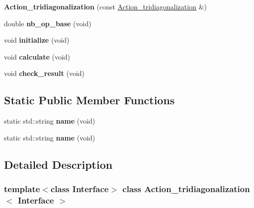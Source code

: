 \begin{DoxyCompactItemize}
\mbox{\label{class_action__tridiagonalization_a8c56518c3b051aa81d9f206db803540f}} 
{\bfseries Action\+\_\+tridiagonalization} (const \hyperlink{class_action__tridiagonalization}{Action\+\_\+tridiagonalization} \&)
\item 
\mbox{\label{class_action__tridiagonalization_a78044c19d7428b20b0bb28b98a4b952d}} 
double {\bfseries nb\+\_\+op\+\_\+base} (void)
\item 
\mbox{\label{class_action__tridiagonalization_a41a1f82250727e2ebf3426ce0c28ddf7}} 
void {\bfseries initialize} (void)
\item 
\mbox{\label{class_action__tridiagonalization_a58d13671dd11a847e0a01a93dec683a3}} 
void {\bfseries calculate} (void)
\item 
\mbox{\label{class_action__tridiagonalization_ae0ae726d0c97c8305e0d8787c4fd6a09}} 
void {\bfseries check\+\_\+result} (void)
\end{DoxyCompactItemize}
\subsection*{Static Public Member Functions}
\begin{DoxyCompactItemize}
\item 
\mbox{\label{class_action__tridiagonalization_a61108bb54c2aaf850cffd03189a6cd87}} 
static std\+::string {\bfseries name} (void)
\item 
\mbox{\label{class_action__tridiagonalization_a61108bb54c2aaf850cffd03189a6cd87}} 
static std\+::string {\bfseries name} (void)
\end{DoxyCompactItemize}


\subsection{Detailed Description}
\subsubsection*{template$<$class Interface$>$\newline
class Action\+\_\+tridiagonalization$<$ Interface $>$}



